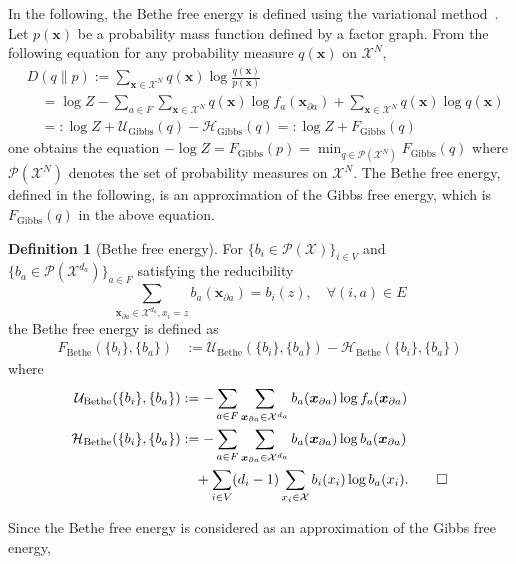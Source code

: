 \documentclass[a4paper,10pt,twoside,twocolumn,openany,final]{memoir}
\theoremstyle{plain}
\theoremstyle{definition}
\newtheorem{definition}[theorem]{Definition}
\theoremstyle{remark}
\begin{document}
In the following, the Bethe free energy is defined using the variational method~\cite{yedidia2005constructing}.
Let $p(\bm{x})$ be a probability mass function defined by a factor graph.
From the following equation for any probability measure $q(\bm{x})$ on $\mathcal{X}^N$,
\begin{align*}
&D(q\| p) := \sum_{\bm{x}\in\mathcal{X}^N} q(\bm{x})\log \frac{q(\bm{x})}{p(\bm{x})}\\
&\quad = \log Z - \sum_{a\in F} \sum_{\bm{x}\in\mathcal{X}^N} q(\bm{x})\log f_a(\bm{x}_{\partial a})
+ \sum_{\bm{x}\in\mathcal{X}^N} q(\bm{x})\log q(\bm{x})\\
&\quad =: \log Z + \mathcal{U}_\mathrm{Gibbs}(q) - \mathcal{H}_\mathrm{Gibbs}(q)
=: \log Z + F_\mathrm{Gibbs}(q)
\end{align*}
one obtains the equation $-\log Z = F_\mathrm{Gibbs}(p) = \min_{q\in\mathcal{P}(\mathcal{X}^N)} F_\mathrm{Gibbs}(q)$
where $\mathcal{P}(\mathcal{X}^N)$ denotes the set of probability measures on $\mathcal{X}^N$.
The Bethe free energy, defined in the following, is an approximation of the Gibbs free energy, which is $F_\mathrm{Gibbs}(q)$
in the above equation.
\begin{definition}[Bethe free energy]
For $\{b_i\in\mathcal{P}(\mathcal{X})\}_{i\in V}$ and $\{b_a\in\mathcal{P}(\mathcal{X}^{d_a})\}_{a\in F}$ satisfying the reducibility 
\begin{equation}\label{eq:marginal}
\sum_{\bm{x}_{\partial a} \in\mathcal{X}^{d_a}, x_i = z} b_a(\bm{x}_{\partial a}) = b_i(z),\quad \forall (i,a)\in E
\end{equation}
the Bethe free energy is defined as
\begin{align*}
F_\mathrm{Bethe}(\{b_i\}, \{b_a\}) &:= \mathcal{U}_\mathrm{Bethe}(\{b_i\}, \{b_a\}) - \mathcal{H}_\mathrm{Bethe}(\{b_i\}, \{b_a\})
\end{align*}
where
\begin{align*}
\mathcal{U}_\mathrm{Bethe}(\{b_i\}, \{b_a\})
&:= -\sum_{a\in F} \sum_{\bm{x}_{\partial a}\in\mathcal{X}^{d_a}} b_a(\bm{x}_{\partial a})\log f_a(\bm{x}_{\partial a})\\
\mathcal{H}_\mathrm{Bethe}(\{b_i\}, \{b_a\})
&:= -\sum_{a\in F} \sum_{\bm{x}_{\partial a}\in\mathcal{X}^{d_a}} b_a(\bm{x}_{\partial a})\log b_a(\bm{x}_{\partial a})\\
&\quad +\sum_{i\in V} (d_i-1)\sum_{x_{i}\in\mathcal{X}} b_i(x_i)\log b_a(x_i).\qed
\end{align*}
\end{definition}
Since the Bethe free energy is considered as an approximation of the Gibbs free energy,
\end{document}
